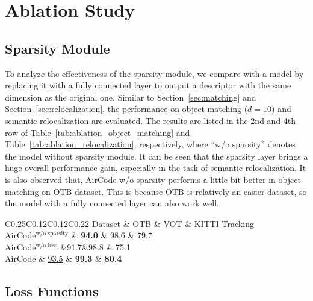\documentclass[letterpaper, 10 pt, journal, twoside]{IEEEtran}  %
\newcommand{\sref}[1]{Section~\ref{#1}}
\newcommand{\tref}[1]{Table~\ref{#1}}
\newcommand{\fix}[1]{#1}
\begin{document}
\fix{
\section{Ablation Study}

\subsection{Sparsity Module}

To analyze the effectiveness of the sparsity module, we compare with a model by replacing it with a fully connected layer to output a descriptor with the same dimension as the original one.
Similar to \sref{sec:matching} and \sref{sec:relocalization}, the performance on object matching ($d=10$) and semantic relocalization are evaluated.
The results are listed in the 2nd and 4th row of \tref{tab:ablation_object_matching} and \tref{tab:ablation_relocalization}, respectively, where ``w/o sparsity'' denotes the model without sparsity module.
It can be seen that the sparsity layer brings a huge overall performance gain, especially in the task of semantic relocalization.
It is also observed that, AirCode w/o sparsity performs a little bit better in object matching on OTB dataset. This is because OTB is relatively an easier dataset, so the model with a fully connected layer can also work well.


\begin{table}[t]
    \caption{\fix{The Ablation Study on Object Matching.}}
    \label{tab:ablation_object_matching}
    \centering
    \begin{tabular}{C{0.25\linewidth}C{0.12\linewidth}C{0.12\linewidth}C{0.22\linewidth}}
        \toprule
        Dataset & OTB & VOT & KITTI Tracking\\
        \midrule
        AirCode$^{\text{w/o sparsity}}$ & \textbf{94.0} & 98.6 & 79.7 \\ 
        AirCode$^{\text{w/o loss}}$ &91.7&98.8 & 75.1  \\  
        AirCode & \underline{93.5} & \textbf{99.3} & \textbf{80.4} \\ 
        \bottomrule
    \end{tabular}
\end{table}



\subsection{Loss Functions}

}
\end{document}
